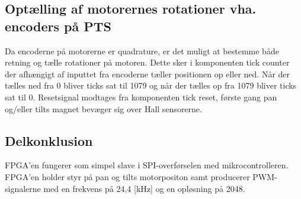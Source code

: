 \subsection{Optælling af motorernes rotationer vha. encoders på PTS}
Da encoderne på motorerne er quadrature,
er det muligt at bestemme både retning og tælle rotationer på motoren. 
Dette sker i komponenten tick counter der afhængigt af inputtet fra encoderne tæller positionen op eller 
ned.
Når der tælles ned fra 0 bliver ticks sat til 1079 
og når der tælles op fra 1079 bliver ticks sat til 0.
Resetsignal modtages fra komponenten tick reset, første gang pan og/eller tilts magnet bevæger 
sig over Hall sensorerne.

\subsection{Delkonklusion}
FPGA'en fungerer som simpel slave i SPI-overførselen med mikrocontrolleren.
FPGA'en holder styr på pan og tilts motorpositon samt producerer PWM-signalerne 
med en frekvens på 24,4 [kHz] og en opløsning på 2048.